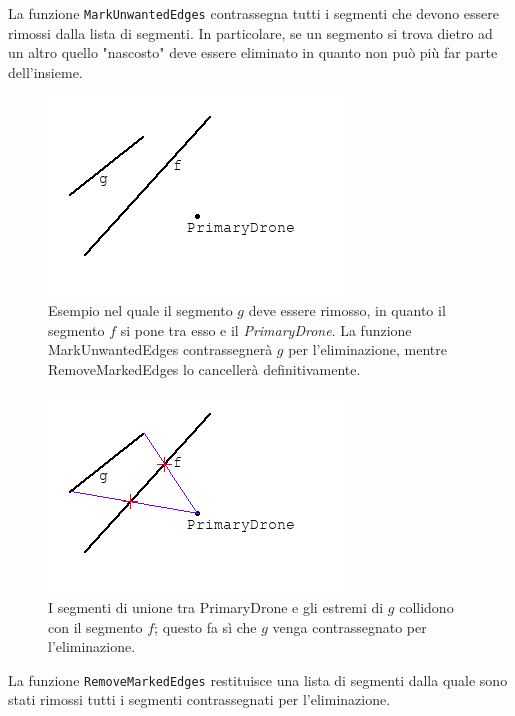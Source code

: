 \documentclass[10pt,a4paper]{article}
\newcommand{\modelicaclass}[1]{

}
\newcommand{\name}[1]{{\color{purple}#1}}
\begin{document}
La funzione \verb|MarkUnwantedEdges| contrassegna tutti i segmenti che devono essere rimossi dalla lista di segmenti. In particolare, se un segmento si trova dietro ad un altro quello "nascosto" deve essere eliminato in quanto non può più far parte dell'insieme.

\label{mark_unwanted_edges}

\begin{figure}[H]
\centering
\includegraphics[scale=0.7]{rimozione_segmento.png}
\caption{Esempio nel quale il segmento $g$ deve essere rimosso, in quanto il segmento $f$ si pone tra esso e il \textit{PrimaryDrone}. La funzione \name{MarkUnwantedEdges} contrassegnerà $g$ per l'eliminazione, mentre \name{RemoveMarkedEdges} lo cancellerà definitivamente.}
\end{figure}

\begin{figure}[H]
\centering
\includegraphics[scale=0.7]{rimozione_segmento2.png}
\caption{I segmenti di unione tra \name{PrimaryDrone} e gli estremi di $g$ collidono con il segmento $f$; questo fa sì che $g$ venga contrassegnato per l'eliminazione.}
\end{figure}

\modelicaclass{MarkUnwantedEdges.mo}

La funzione \verb|RemoveMarkedEdges| restituisce una lista di segmenti dalla quale sono stati rimossi tutti i segmenti contrassegnati per l'eliminazione.

\modelicaclass{RemoveMarkedEdges.mo}
\end{document}
